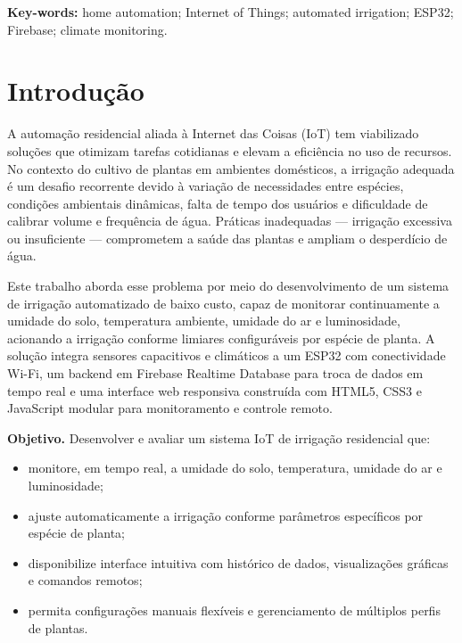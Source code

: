 \documentclass[twoside,english,brazilian]{UNISINOSmonografia}
\begin{document}
\medskip
\noindent\textbf{Key-words:} home automation; Internet of Things; automated irrigation; ESP32; Firebase; climate monitoring.

\chapter{Introdução}

A automação residencial aliada à Internet das Coisas (IoT) tem viabilizado soluções que otimizam tarefas cotidianas e elevam a eficiência no uso de recursos. No contexto do cultivo de plantas em ambientes domésticos, a irrigação adequada é um desafio recorrente devido à variação de necessidades entre espécies, condições ambientais dinâmicas, falta de tempo dos usuários e dificuldade de calibrar volume e frequência de água. Práticas inadequadas — irrigação excessiva ou insuficiente — comprometem a saúde das plantas e ampliam o desperdício de água.

Este trabalho aborda esse problema por meio do desenvolvimento de um sistema de irrigação automatizado de baixo custo, capaz de monitorar continuamente a umidade do solo, temperatura ambiente, umidade do ar e luminosidade, acionando a irrigação conforme limiares configuráveis por espécie de planta. A solução integra sensores capacitivos e climáticos a um ESP32 com conectividade Wi-Fi, um backend em Firebase Realtime Database para troca de dados em tempo real e uma interface web responsiva construída com HTML5, CSS3 e JavaScript modular para monitoramento e controle remoto.

\medskip
\noindent\textbf{Objetivo.} Desenvolver e avaliar um sistema IoT de irrigação residencial que:
\begin{itemize}
    \item monitore, em tempo real, a umidade do solo, temperatura, umidade do ar e luminosidade;
    \item ajuste automaticamente a irrigação conforme parâmetros específicos por espécie de planta;
    \item disponibilize interface intuitiva com histórico de dados, visualizações gráficas e comandos remotos;
    \item permita configurações manuais flexíveis e gerenciamento de múltiplos perfis de plantas.
\end{itemize}
\end{document}
